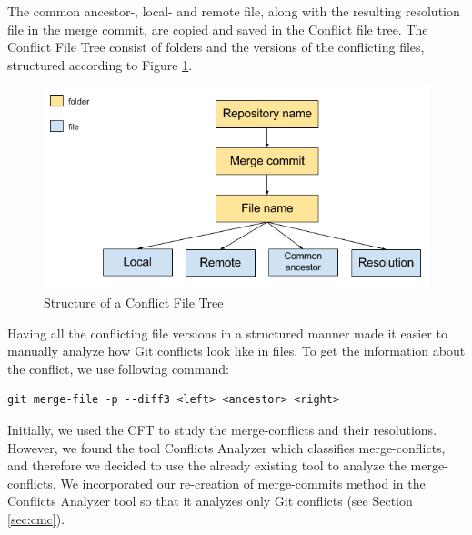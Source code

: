 The common ancestor-, local- and remote file, along with the resulting resolution file in the merge commit, are copied and saved in the Conflict file tree. The Conflict File Tree consist of folders and the versions of the conflicting files, structured according to Figure \ref{fig:cft}.\\
\begin{figure}[H]
\centering
\includegraphics[width=400pt]{figure/conflicts.png}
\caption{Structure of a Conflict File Tree}\label{fig:cft}
\end{figure}

Having all the conflicting file versions in a structured manner made it easier to manually analyze how Git conflicts look like in files. To get the information about the conflict, we use following command:
\lstset{language=Bash,numbers=left,xleftmargin=2em,frame=single,framexleftmargin=1.5em}
\begin{lstlisting}[frame=single,breaklines=true,tabsize=2]
git merge-file -p --diff3 <left> <ancestor> <right>
\end{lstlisting}
Initially, we used the CFT to study the merge-conflicts and their resolutions. However, we found the tool Conflicts Analyzer which classifies merge-conflicts, and therefore we decided to use the already existing tool to analyze the merge-conflicts. We incorporated our re-creation of merge-commits method in the Conflicts Analyzer tool so that it analyzes only Git conflicts (see Section \ref{sec:cmc}).

